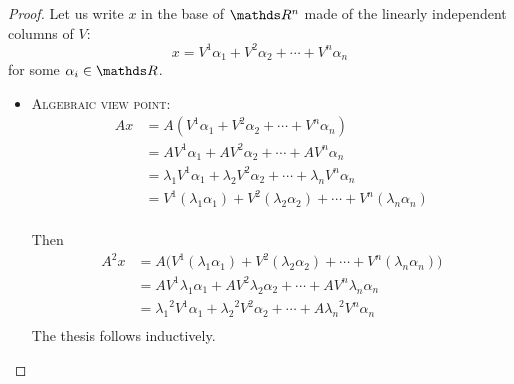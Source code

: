 \documentclass[ComputationalMathematics.tex]{subfiles}
\begin{document}
\begin{proof}
  Let us write $x$ in the base of $\R^n$ made of the linearly independent columns of $V$:
  \[
x = V^1 \alpha_1 + V^2 \alpha_2 + \cdots + V^n \alpha_n
  \]
  for some $\alpha_i \in \R$.

 \begin{itemize}
   \item \textsc{Algebraic view point:}
  \begin{equation}
    \begin{split}
      Ax &= A ( V^1 \alpha_1 + V^2 \alpha_2 + \cdots + V^n \alpha_n)\\
      &= A V^1 \alpha_1 + A V^2 \alpha_2 + \cdots + A V^n \alpha_n\\
      & = \lambda_1 V^1 \alpha_1 + \lambda_2 V^2 \alpha_2 + \cdots + \lambda_n V^n \alpha_n\\
      &= V^1 (\lambda_1 \alpha_1) + V^2 (\lambda_2 \alpha_2) + \cdots + V^n (\lambda_n \alpha_n)\\
    \end{split}
  \end{equation}

  Then
 \begin{equation}
    \begin{split}
      A^2 x &= A \Big (V^1 (\lambda_1 \alpha_1) + V^2 (\lambda_2 \alpha_2) + \cdots + V^n (\lambda_n \alpha_n) \Big )\\
      &= A V^1 \lambda_1 \alpha_1 + A V^2 \lambda_2 \alpha_2 + \cdots + A V^n \lambda_n \alpha_n\\
      &= {\lambda_1}^2 V^1 \alpha_1 + {\lambda_2}^2 V^2 \alpha_2 + \cdots + A {\lambda_n}^2 V^n \alpha_n\\
    \end{split}
  \end{equation}
The thesis follows inductively.
  

\end{itemize}
\end{proof}
\end{document}
